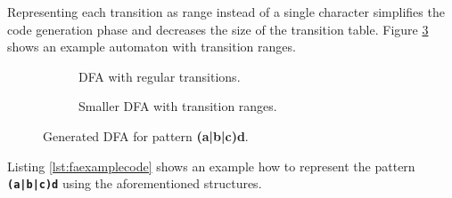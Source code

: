 Representing each transition as range instead of a single character simplifies the code generation phase and decreases the size of the transition table. Figure \ref{fig:automatonrange} shows an example automaton with transition ranges.

\begin{figure}[H]
\begin{subfigure}[b]{\textwidth}
\centering
{}
\caption{DFA with regular transitions.}\label{fig:automatonrangea}
\end{subfigure}
\par\bigskip
\begin{subfigure}[b]{\textwidth}
\centering
{}
\caption{Smaller DFA with transition ranges.}\label{fig:automatonrangeb}

\end{subfigure}
\caption{Generated DFA for pattern \textbf{(a|b|c)d}.}\label{fig:automatonrange}
\end{figure}

Listing \ref{lst:faexamplecode} shows an example how to represent the pattern \texttt{\textbf{(a|b|c)d}} using the aforementioned structures.

